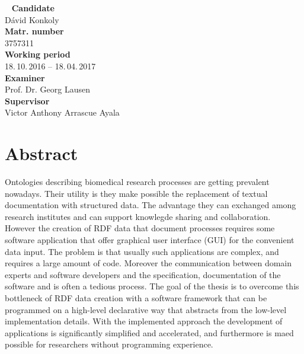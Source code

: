 


%
\newpage
~\vfill
\noindent \textbf{Candidate}\smallskip{}
\\
Dávid Konkoly \smallskip{}
\\
\noindent \textbf{Matr. number}\smallskip{}
\\
3757311 \smallskip{}
\\
\textbf{Working period}\smallskip{}
\\
18.\,10.\,2016 -- 18.\,04.\,2017 \smallskip{}
\\
\textbf{Examiner}\smallskip{}
\\
Prof. Dr. Georg Lausen\smallskip{}
\\
\textbf{Supervisor}\smallskip{}
\\
Victor Anthony Arrascue Ayala\\

\newpage
\chapter*{Abstract}


Ontologies describing biomedical research processes are getting prevalent nowadays.  Their utility is they make possible the replacement of textual documentation with structured data. The advantage they can exchanged among research institutes and can support knowlegde sharing and collaboration. However the creation of RDF data that document processes requires some software application that offer graphical user interface (GUI) for the convenient data input. The problem is that usually such applications are complex, and requires a large amount of code. Moreover the communication between domain experts and software developers and the specification, documentation of the software and is often a tedious process. The goal of the thesis is to overcome this bottleneck of RDF data creation with a software framework that can be programmed on a high-level declarative way that abstracts from the low-level implementation details. With the implemented approach the development of applications is significantly simplified and accelerated, and furthermore is maed possible for researchers without programming experience.



